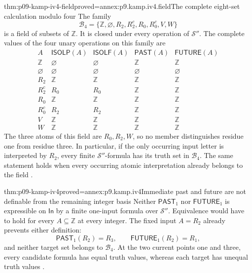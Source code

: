 \begin{hblemma}{thm:p09-kamp-iv4-field}{proved=annex:p9.kamp.iv4.field}{The complete eight-set calculation modulo four}
The family
\[
 \mathcal B_4=
 \{\mathbb Z,\varnothing,R_2,R_2^c,R_0,R_0^c,V,W\}
\]
is a field of subsets of \(\mathbb Z\). It is closed under
every operation of \(\mathcal S''\). The complete values of
the four unary operations on this family are
\[
\begin{array}{c|cc|cc}
 A&\mathsf{ISOLP}(A)&\mathsf{ISOLF}(A)
     &\mathsf{PAST}(A)&\mathsf{FUTURE}(A)\\ \hline
 \mathbb Z&\varnothing&\varnothing&\mathbb Z&\mathbb Z\\
 \varnothing&\varnothing&\varnothing&\varnothing&\varnothing\\
 R_2&\mathbb Z&\mathbb Z&\mathbb Z&\mathbb Z\\
 R_2^c&R_0&R_0&\mathbb Z&\mathbb Z\\
 R_0&\mathbb Z&\mathbb Z&\mathbb Z&\mathbb Z\\
 R_0^c&R_2&R_2&\mathbb Z&\mathbb Z\\
 V&\mathbb Z&\mathbb Z&\mathbb Z&\mathbb Z\\
 W&\mathbb Z&\mathbb Z&\mathbb Z&\mathbb Z
\end{array}
\]
The three atoms of this field are \(R_0,R_2,W\), so no
member distinguishes residue one from residue three. In particular,
if the only occurring input letter is interpreted by \(R_2\),
every finite \(\mathcal S''\)-formula has its truth set in
\(\mathcal B_4\). The same statement holds when every
occurring atomic interpretation already belongs to the field
\cite[ch.~IV, pp.~108--109]{Kamp1968}.
\end{hblemma}

\begin{hbtheorem}{thm:p09-kamp-iv4}{proved=annex:p9.kamp.iv4}{Immediate past and future are not definable from the remaining integer basis}
Neither \(\mathsf{PAST}_1\) nor \(\mathsf{FUTURE}_1\)
is expressible on \(\mathsf{In}\) by a finite one-input
formula over \(\mathcal S''\). Equivalence would have to
hold for every \(A\subseteq\mathbb Z\) at every integer.
The fixed input \(A=R_2\) already prevents either definition:
\[
              \mathsf{PAST}_1(R_2)=R_3,
       \qquad \mathsf{FUTURE}_1(R_2)=R_1,
\]
and neither target set belongs to \(\mathcal B_4\).
At the two current points one and three, every candidate formula
has equal truth values, whereas each target has unequal truth values
\cite[ch.~IV, thm.~4, pp.~108--109]{Kamp1968}.
\end{hbtheorem}

